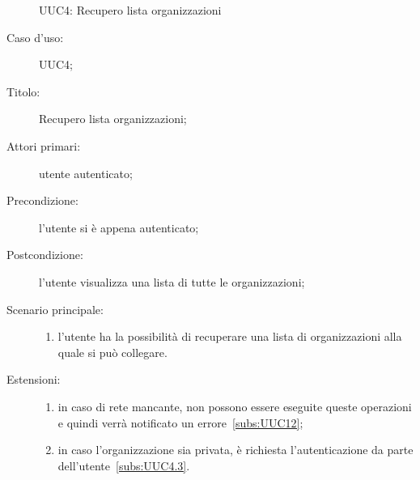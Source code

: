 \documentclass[../../../analisi-dei-requisiti.tex]{subfiles}
\begin{document}
\begin{figure}[H]
  \centering
  \caption{UUC4: Recupero lista organizzazioni}%
  \label{fig:uuc4}
\end{figure}

\begin{description}
  \item[Caso d’uso:] UUC4;
  \item[Titolo:] Recupero lista organizzazioni;
  \item[Attori primari:] utente autenticato;
  \item[Precondizione:] l'utente si è appena autenticato;
  \item[Postcondizione:] l'utente visualizza una lista di tutte le organizzazioni;
  \item[Scenario principale:]
        \begin{enumerate}
          \item l'utente ha la possibilità di recuperare una lista di organizzazioni alla quale si può collegare.
        \end{enumerate}
  \item[Estensioni:]
        \begin{enumerate}
          \item in caso di rete mancante, non possono essere eseguite queste operazioni e quindi verrà notificato un errore~\ref{subs:UUC12};
          \item in caso l'organizzazione sia privata, è richiesta l'autenticazione da parte dell'utente~\ref{subs:UUC4.3}.
        \end{enumerate}
\end{description}
\end{document}
